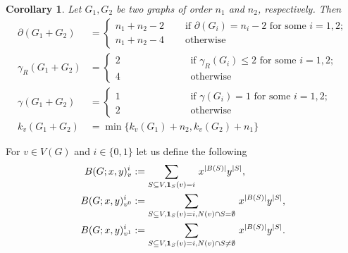 \documentclass[review]{elsarticle}
\newtheorem{corollary}[theorem]{Corollary}
\newcommand{\g}{\gamma}
\newcommand{\p}{\partial}
\begin{document}
\begin{corollary}\label{c:join_properties}
  Let $G_1,G_2$ be two graphs of order $n_1$ and $n_2$, respectively. Then
  \begin{equation}\label{eq:join_properties}
   \begin{aligned}
       \p(G_1+G_2)&=\displaystyle\left\{\begin{array}{cc} n_1+n_2-2 & \quad \text{ if } \p(G_i)=n_i-2 \text{ for some } i=1,2; \\ n_1+n_2-4 & \quad \text{ otherwise} \end{array}\right. \\
       \g_R(G_1+G_2)&=\displaystyle\left\{\begin{array}{cc} 2 & \qquad\qquad\qquad \text{ if } \g_R(G_i)\le2 \text{ for some } i=1,2; \\ 4 & \qquad\qquad\qquad \text{ otherwise} \end{array}\right. \\
       \g(G_1+G_2)&=\displaystyle\left\{\begin{array}{cc} 1 & \qquad\qquad\qquad \text{ if } \g(G_i)=1 \text{ for some } i=1,2; \\ 2 & \qquad\qquad\qquad \text{ otherwise} \end{array}\right. \\
       k_v(G_1+G_2)&=\displaystyle\min\{k_v(G_1)+n_2,k_v(G_2)+n_1\}
   \end{aligned}
  \end{equation}
\end{corollary}





For $v\in V(G)$ and $i\in\{0,1\}$ let us define the following
\
\begin{equation}\label{eq:def1}
\begin{aligned}
 B(G;x,y)^{i}_v & :=\displaystyle \sum_{S\subseteq V,
{\bf 1}_S(v)=i} \, x^{|B(S)|}y^{|S|},
\\
B(G;x,y)^{i}_{v^{0}}& :=\displaystyle \sum_{S\subseteq
V,{\bf 1}_S(v)=i, N(v)\cap S=\emptyset} \, x^{|B(S)|}y^{|S|},
\\
B(G;x,y)^{i}_{v^{1}} & :=\displaystyle \sum_{S\subseteq
V,{\bf 1}_S(v)=i,N(v)\cap S \neq\emptyset} \, x^{|B(S)|}y^{|S|}.
\end{aligned}
\end{equation}
\end{document}
